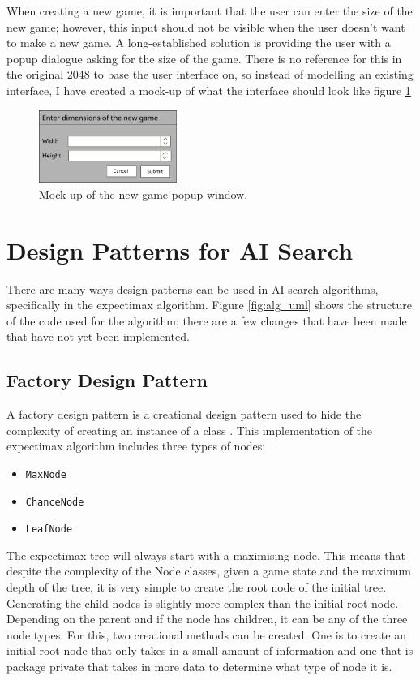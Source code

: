 \documentclass{article}
\begin{document}
When creating a new game, it is important that the user can enter the size of the new game; however, this input should not be visible when the user doesn't want to make a new game. A long-established solution is providing the user with a popup dialogue asking for the size of the game. There is no reference for this in the original 2048 to base the user interface on, so instead of modelling an existing interface, I have created a mock-up of what the interface should look like figure \ref{fig:popup}

\begin{figure}
    \centering
    \includegraphics[width=0.4\textwidth]{newGamePopup.png}
    \caption{Mock up of the new game popup window.}
    \label{fig:popup}
\end{figure}
\section{Design Patterns for AI Search}
\label{sec:dp}
There are many ways design patterns can be used in AI search algorithms, specifically in the expectimax algorithm. Figure \ref{fig:alg_uml} shows the structure of the code used for the algorithm; there are a few changes that have been made that have not yet been implemented.


\subsection{Factory Design Pattern}
\label{subsec:factory}
A factory design pattern is a creational design pattern used to hide the complexity of creating an instance of a class \cite{CS2800_creational}. This implementation of the expectimax algorithm includes three types of nodes:
\begin{itemize}
    \item \texttt{MaxNode}
    \item \texttt{ChanceNode}
    \item \texttt{LeafNode}
\end{itemize}
The  expectimax tree will always start with a maximising node. This means that despite the complexity of the Node classes, given a game state and the maximum depth of the tree, it is very simple to create the root node of the initial tree. Generating the child nodes is slightly more complex than the initial root node. Depending on the parent and if the node has children, it can be any of the three node types. For this, two creational methods can be created. One is to create an initial root node that only takes in a small amount of information and one that is package private that takes in more data to determine what type of node it is.
\end{document}
